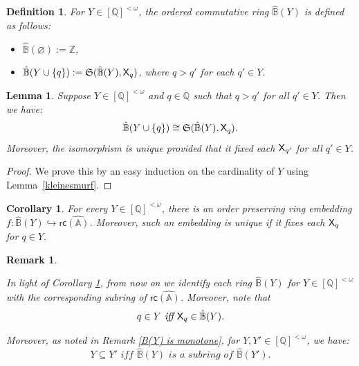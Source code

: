 \documentclass{amsart}
\newcommand{\qee} {\hspace*{2mm}\hfill \ding{109}}
\newtheorem{define}[theorem]{Definition}
\newenvironment{definition}{\begin{define} \rm}{\qee\end{define}}
\newtheorem{lem}[theorem]{Lemma}
\newtheorem{cor}[theorem]{Corollary}
\newtheorem{rem}[theorem]{Remark}
\newcommand{\verz}[1]{\{ #1 \}}
\newcommand{\X}{{\sf X}}
\newcommand{\shef}{\mathfrak{S}}
\newcommand{\fsvar}{Y}
\begin{document}
\begin{definition} \label{def_of F, B-hat(r)}
   For $\fsvar \in [\mathbb{Q}]^{<\omega}$, the ordered commutative ring $\hat{\mathbb{B}}(\fsvar)$ is defined as follows: 

\begin{itemize}
\item
    $\hat{\mathbb{B}}({\varnothing}) := \mathbb{Z}$,
        \item
    $\hat{\mathbb{B}}({\fsvar\cup \verz q}) : = \shef(\hat{\mathbb{B}}(\fsvar), \X_{q})$, where $q>q'$ for each $q'\in \fsvar$.
\end{itemize}
\end{definition}
%
\begin{lem}\label{lem_shep_ind}
    Suppose $\fsvar\in [\mathbb{Q}]^{<\omega}$ and $q\in \mathbb{Q}$ such that $q>q'$ for all $q'\in \fsvar$. Then we have:
    $$\hat{\mathbb{B}}({\fsvar\cup \verz q})\cong \shef(\hat{\mathbb {B}} (\fsvar) ,\X_q).$$
    Moreover, the isomorphism is unique provided that it fixed each $\X_{q'}$ for all $q' \in \fsvar$.
\end{lem}

\begin{proof}
We prove this by an easy induction on the cardinality of $\fsvar$ using Lemma~\ref{kleinesmurf}.
\end{proof}

\begin{cor} \label{flatting_B(r)}
    For every $\fsvar\in [\mathbb{Q}]^{<\omega}$, there is an order preserving ring embedding 
    $f: \hat{\mathbb{B}}(\fsvar)\hookrightarrow \mathsf{rc}\hat{(\mathbb{A})}$. Moreover, such an embedding is unique if it fixes each $\X_q$ for $q\in \fsvar$.
\end{cor} 

\begin{rem} \label{directedness_of_B-hat(r)}
    
In light of Corollary \ref{flatting_B(r)}, from now on we 
identify each ring $\hat{\mathbb{B}}(\fsvar)$ for $\fsvar\in[\mathbb{Q}]^{<\omega}$ with the corresponding 
subring of $\mathsf{rc}\hat{(\mathbb{A})}$. Moreover, note that 
$$q\in \fsvar\textit{~iff~}{\sf X}_q\in \hat{\mathbb{B}}(\fsvar).$$


Moreover, as noted in Remark \ref{B(Y) is monotone}, for $\fsvar,\fsvar' \in [\mathbb{Q}]^{<\omega}$, we have:$$\fsvar\subseteq \fsvar'
\textit{~iff~} \hat{\mathbb{B}}(\fsvar)\textit{~is~a~subring~of~} \hat{\mathbb{B}}(\fsvar').$$
\end{rem}
\end{document}
